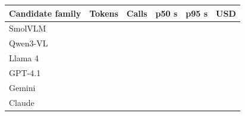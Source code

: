\begin{tabular}{lrrrrr}
\toprule
Candidate family & Tokens & Calls & p50 s & p95 s & USD\\\midrule
SmolVLM &  &  &  &  & \\
Qwen3-VL &  &  &  &  & \\
Llama 4 &  &  &  &  & \\
GPT-4.1 &  &  &  &  & \\
Gemini &  &  &  &  & \\
Claude &  &  &  &  & \\
\bottomrule
\end{tabular}
